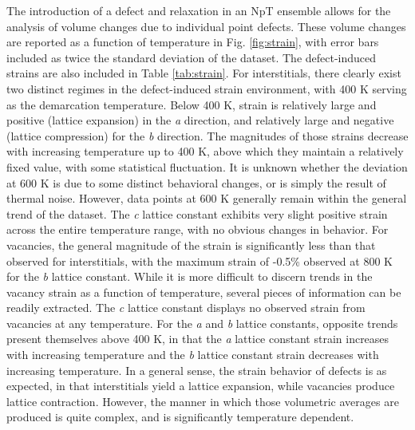\documentclass[utf8]{frontiersSCNS} %
\begin{document}
The introduction of a defect and relaxation in an NpT ensemble allows for the analysis of volume changes due to individual point defects. These volume changes are reported as a function of temperature in Fig. \ref{fig:strain}, with error bars included as twice the standard deviation of the dataset. The defect-induced strains are also included in Table \ref{tab:strain}. For interstitials, there clearly exist two distinct regimes in the defect-induced strain environment, with 400 K serving as the demarcation temperature. Below 400 K, strain is relatively large and positive (lattice expansion) in the \textit{a} direction, and relatively large and negative (lattice compression) for the \textit{b} direction. The magnitudes of those strains decrease with increasing temperature up to 400 K, above which they maintain a relatively fixed value, with some statistical fluctuation. It is unknown whether the deviation at 600 K is due to some distinct behavioral changes, or is simply the result of thermal noise. However, data points at 600 K generally remain within the general trend of the dataset. The \textit{c} lattice constant exhibits very slight positive strain across the entire temperature range, with no obvious changes in behavior. For vacancies, the general magnitude of the strain is significantly less than that observed for interstitials, with the maximum strain of -0.5\% observed at 800 K for the \textit{b} lattice constant. While it is more difficult to discern trends in the vacancy strain as a function of temperature, several pieces of information can be readily extracted. The \textit{c} lattice constant displays no observed strain from vacancies at any temperature. For the \textit{a} and \textit{b} lattice constants, opposite trends present themselves above 400 K, in that the \textit{a} lattice constant strain increases with increasing temperature and the \textit{b} lattice constant strain decreases with increasing temperature. In a general sense, the strain behavior of defects is as expected, in that interstitials yield a lattice expansion, while vacancies produce lattice contraction. However, the manner in which those volumetric averages are produced is quite complex, and is significantly temperature dependent. 
\end{document}
